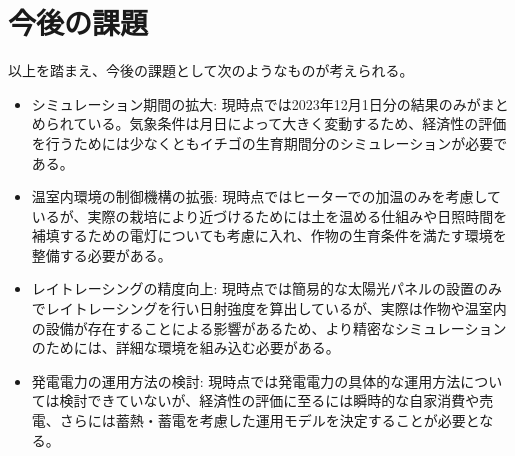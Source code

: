 \documentclass[uplatex,dvipdfmx,nomag,a4paper,oneside,onecolumn,12pt]{bxjsreport} %
\begin{document}
\section{今後の課題}
以上を踏まえ、今後の課題として次のようなものが考えられる。
\begin{itemize}
    \item シミュレーション期間の拡大: 現時点では2023年12月1日分の結果のみがまとめられている。気象条件は月日によって大きく変動するため、経済性の評価を行うためには少なくともイチゴの生育期間分のシミュレーションが必要である。
    \item 温室内環境の制御機構の拡張: 現時点ではヒーターでの加温のみを考慮しているが、実際の栽培により近づけるためには土を温める仕組みや日照時間を補填するための電灯についても考慮に入れ、作物の生育条件を満たす環境を整備する必要がある。
    \item レイトレーシングの精度向上: 現時点では簡易的な太陽光パネルの設置のみでレイトレーシングを行い日射強度を算出しているが、実際は作物や温室内の設備が存在することによる影響があるため、より精密なシミュレーションのためには、詳細な環境を組み込む必要がある。
    \item 発電電力の運用方法の検討: 現時点では発電電力の具体的な運用方法については検討できていないが、経済性の評価に至るには瞬時的な自家消費や売電、さらには蓄熱・蓄電を考慮した運用モデルを決定することが必要となる。
\end{itemize}

\backmatter








\end{document}
